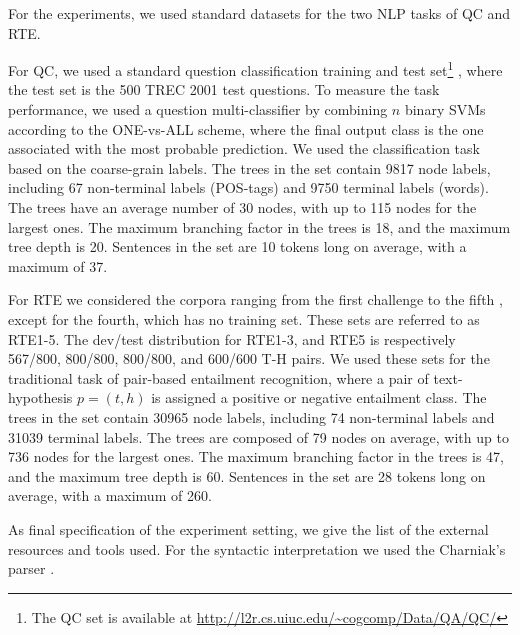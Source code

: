 \documentclass[twoside,11pt]{article}
\def\comment#1#2{}
\begin{document}


For the experiments, we used standard datasets for the two NLP tasks of QC and RTE. \comment{R3, C4}{please provide more info on the datasets, such as labels and tree distribution (length etc)}

For QC, we used a standard question classification training and test set\footnote{The QC set is available at \url{http://l2r.cs.uiuc.edu/~cogcomp/Data/QA/QC/}} \cite{Li:2002:LQC:1072228.1072378}, where the test set is the 500 TREC 2001 test questions. To measure the task performance, we used a question multi-classifier by combining $n$ binary SVMs according to the ONE-vs-ALL scheme, where the final output class is the one associated with the most probable prediction. We used the classification task based on the coarse-grain labels. The trees in the set contain 9817 node labels, including 67 non-terminal labels (POS-tags) and 9750 terminal labels (words). The trees have an average number of 30 nodes, with up to 115 nodes for the largest ones. The maximum branching factor in the trees is 18, and the maximum tree depth is 20. Sentences in the set are 10 tokens long on average, with a maximum of 37.

For RTE we considered the corpora ranging from the first challenge to the fifth \cite{RTE1}, except for the fourth, which has no training set. These sets are referred to as RTE1-5. The dev/test distribution for RTE1-3, and RTE5 is respectively 567/800, 800/800, 800/800, and 600/600 T-H pairs. We used these sets for the traditional task of pair-based entailment recognition, where a pair of text-hypothesis $p=(t,h)$ is assigned a positive or negative entailment class. The trees in the set contain 30965 node labels, including 74 non-terminal labels and 31039 terminal labels. The trees are composed of 79 nodes on average, with up to 736 nodes for the largest ones. The maximum branching factor in the trees is 47, and the maximum tree depth is 60. Sentences in the set are 28 tokens long on average, with a maximum of 260.

As final specification of the experiment setting, we give the list of the external resources and tools used. For the syntactic interpretation we used the Charniak's parser \cite{Charniak00}. 
\end{document}
